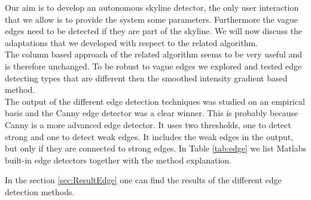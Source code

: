 Our aim is to develop an autonomous skyline detector, the only user interaction
that we allow is to provide the system some parameters. Furthermore the vague
edges need to be detected if they are part of the skyline. We will now discuss
the adaptations that we developed with respect to the related algorithm.\\

The column based approach of the related algorithm seems to be very useful and is
therefore unchanged. To be robust to vague edges we explored and tested
edge detecting types that are different then the smoothed intensity gradient
based method.\\

\label{sec:edgeDet}
The output of the different edge detection techniques was studied on an empirical
basis and the Canny edge detector \cite{Canny} was a clear winner. This is
probably because Canny is a more advanced edge detector. It uses two
thresholds, one to detect strong and one to detect weak edges. It includes the weak edges in the
output, but only if they are connected to strong edges. In Table \ref{tab:edge} 
we list Matlabs built-in edge detectors together with the method explanation.

In the section \ref{sec:ResultEdge} one can find the results of the different
edge detection methods.


